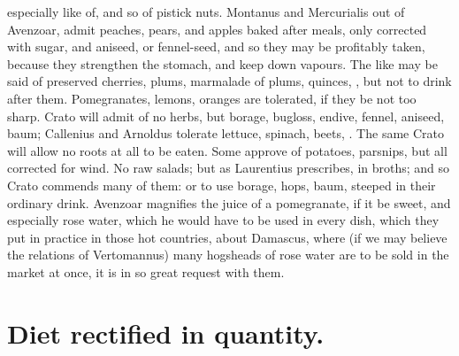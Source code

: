 {especially like of, and so of pistick nuts. Montanus and Mercurialis
out of Avenzoar, admit peaches, pears, and apples baked after
meals, only corrected with sugar, and aniseed, or fennel-seed, and so
they may be profitably taken, because they strengthen the stomach, and
keep down vapours. The like may be said of preserved cherries, plums,
marmalade of plums, quinces, \etc{}, but not to drink after them.
Pomegranates, lemons, oranges are tolerated, if they be not too
sharp.
Crato will admit of no herbs, but borage, bugloss, endive,
fennel, aniseed, baum; Callenius and Arnoldus tolerate lettuce,
spinach, beets, \etc{}. The same Crato will allow no roots at all to be
eaten. Some approve of potatoes, parsnips, but all corrected for wind.
No raw salads; but as Laurentius prescribes, in broths; and so Crato
commends many of them: or to use borage, hops, baum, steeped in their
ordinary drink. Avenzoar magnifies the juice of a pomegranate, if
it be sweet, and especially rose water, which he would have to be used
in every dish, which they put in practice in those hot countries, about
Damascus, where (if we may believe the relations of Vertomannus) many
hogsheads of rose water are to be sold in the market at once, it is in
so great request with them.

\section{Diet rectified in quantity.}

}
